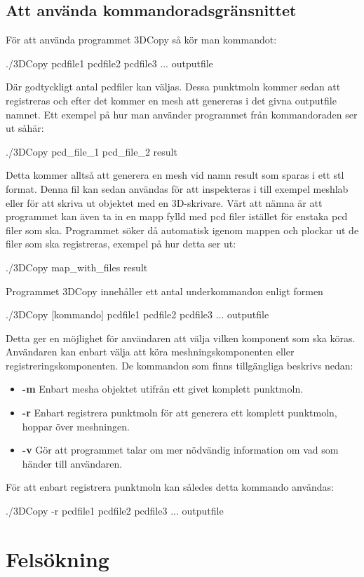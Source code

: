 \documentclass[a4paper,titlepage,12pt]{article}
\begin{document}
	\subsection{Att använda kommandoradsgränsnittet}
		För att använda programmet 3DCopy så kör man kommandot:
		
		./3DCopy pcdfile1 pcdfile2 pcdfile3 ... outputfile
		
		Där godtyckligt antal pcdfiler kan väljas. Dessa punktmoln kommer sedan att registreras och efter det kommer en mesh att genereras i det givna outputfile namnet. Ett exempel på hur man använder programmet från kommandoraden ser ut såhär:
		
		./3DCopy pcd\_file\_1 pcd\_file\_2 result
		
		Detta kommer alltså att generera en mesh vid namn result som sparas i ett stl format. Denna fil kan sedan användas för att inspekteras i till exempel meshlab eller för att skriva ut objektet med en 3D-skrivare. Värt att nämna är att programmet kan även ta in en mapp fylld med pcd filer istället för enstaka pcd filer som ska. Programmet söker då automatisk igenom mappen och plockar ut de filer som ska registreras, exempel på hur detta ser ut:
		
		./3DCopy map\_with\_files result
		
		Programmet 3DCopy innehåller ett antal underkommandon enligt formen
		
		./3DCopy [kommando] pcdfile1 pcdfile2 pcdfile3 ... outputfile
		
		Detta ger en möjlighet för användaren att välja vilken komponent som ska köras. Användaren kan enbart välja att köra meshningskomponenten eller registreringskomponenten. De kommandon som finns tillgängliga beskrivs nedan:
		
		\begin{itemize}
			\item \textbf{-m} Enbart mesha objektet utifrån ett givet komplett punktmoln.
			\item \textbf{-r} Enbart registrera punktmoln för att generera ett komplett punktmoln, hoppar över meshningen.
			\item \textbf{-v} Gör att programmet talar om mer nödvändig information om vad som händer till användaren.
		\end{itemize}
		
		För att enbart registrera punktmoln kan således detta kommando användas:
		
		./3DCopy -r pcdfile1 pcdfile2 pcdfile3 ... outputfile
\newpage  
    
\section{Felsökning}
\newpage
    
%
%
\end{document}
